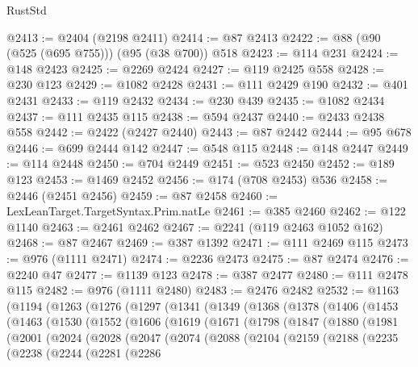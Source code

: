 \begin{lexlean}{RustStd}
\begin{coremodule}
{\begin{coremodule}
{{{{{{{{{{{{{{{{{{{{{{{{{{{{{{{{{{{{{{{{{{{{{{{{{{{{{{{{{{{{{{{{{{{{{{{{{{{{{{@2413 := @2404 (@2198 @2411)
@2414 := @87 @2413
@2422 := @88 (@90 (@525 (@695 @755))) (@95 (@38 @700)) @518
@2423 := @114 @231
@2424 := @148 @2423
@2425 := @2269 @2424
@2427 := @119 @2425 @558
@2428 := @230 @123
@2429 := @1082 @2428
@2431 := @111 @2429 @190
@2432 := @401 @2431
@2433 := @119 @2432
@2434 := @230 @439
@2435 := @1082 @2434
@2437 := @111 @2435 @115
@2438 := @594 @2437
@2440 := @2433 @2438 @558
@2442 := @2422 (@2427 @2440)
@2443 := @87 @2442
@2444 := @95 @678
@2446 := @699 @2444 @142
@2447 := @548 @115
@2448 := @148 @2447
@2449 := @114 @2448
@2450 := @704 @2449
@2451 := @523 @2450
@2452 := @189 @123
@2453 := @1469 @2452
@2456 := @174 (@708 @2453) @536
@2458 := @2446 (@2451 @2456)
@2459 := @87 @2458
@2460 := LexLeanTarget.TargetSyntax.Prim.natLe
@2461 := @385 @2460
@2462 := @122 @1140
@2463 := @2461 @2462
@2467 := @2241 (@119 @2463 @1052 @162)
@2468 := @87 @2467
@2469 := @387 @1392
@2471 := @111 @2469 @115
@2473 := @976 (@1111 @2471)
@2474 := @2236 @2473
@2475 := @87 @2474
@2476 := @2240 @47
@2477 := @1139 @123
@2478 := @387 @2477
@2480 := @111 @2478 @115
@2482 := @976 (@1111 @2480)
@2483 := @2476 @2482
@2532 := @1163
    (@1194
      (@1263
        (@1276
          (@1297
            (@1341
              (@1349
                (@1368
                  (@1378
                    (@1406
                      (@1453
                        (@1463
                          (@1530
                            (@1552
                              (@1606
                                (@1619
                                  (@1671
                                    (@1798
                                      (@1847
                                        (@1880
                                          (@1981
                                            (@2001
                                              (@2024
                                                (@2028
                                                  (@2047
                                                    (@2074
                                                      (@2088
                                                        (@2104
                                                          (@2159
                                                            (@2188
                                                              (@2235
                                                                (@2238
                                                                  (@2244
                                                                    (@2281
                                                                      (@2286
}}}}}}}}}}}}}}}}}}}}}}}}}}}}}}}}}}}}}}}}}}}}}}}}}}}}}}}}}}}}}}}}}}}}}}}}}}}}}}
\end{coremodule}}
\end{coremodule}
\end{lexlean}

